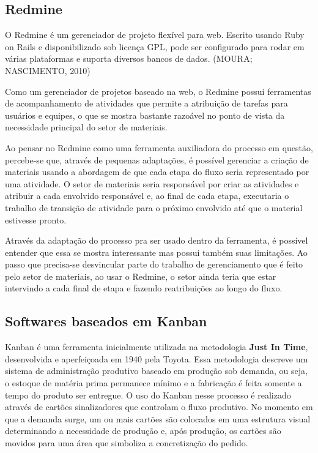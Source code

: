 \subsection{Redmine}

O Redmine é um gerenciador de projeto flexível para web. Escrito usando Ruby on Rails e disponibilizado sob licença GPL, pode ser configurado para rodar em várias plataformas e suporta diversos bancos de dados. (MOURA; NASCIMENTO, 2010)

Como um gerenciador de projetos baseado na web, o Redmine possui ferramentas de acompanhamento de atividades que permite a atribuição de tarefas para usuários e equipes, o que se mostra bastante razoável no ponto de vista da necessidade principal do setor de materiais. 

Ao pensar no Redmine como uma ferramenta auxiliadora do processo em questão, percebe-se que, através de pequenas adaptações, é possível gerenciar a criação de materiais usando a abordagem de que cada etapa do fluxo seria representado por uma atividade. O setor de materiais seria responsável por criar as atividades e atribuir a cada envolvido responsável e, ao final de cada etapa, executaria o trabalho de transição de atividade para o próximo envolvido até que o material estivesse pronto.

Através da adaptação do processo pra ser usado dentro da ferramenta, é possível entender que essa se mostra interessante mas possui também suas limitações. Ao passo que precisa-se desvincular parte do trabalho de gerenciamento que é feito pelo setor de materiais, ao usar o Redmine, o setor ainda teria que estar intervindo a cada final de etapa e fazendo reatribuições ao longo do fluxo.

\subsection{Softwares baseados em Kanban}

Kanban é uma ferramenta inicialmente utilizada na metodologia \textbf{Just In Time}, desenvolvida e aperfeiçoada em 1940 pela Toyota. Essa metodologia descreve um sistema de administração produtivo baseado em produção sob demanda, ou seja, o estoque de matéria prima permanece mínimo e a fabricação é feita somente a tempo do produto ser entregue. O uso do Kanban nesse processo é realizado através de cartões sinalizadores que controlam o fluxo produtivo. No momento em que a demanda surge, um ou mais cartões são colocados em uma estrutura visual determinando a necessidade de produção e, após produção, os cartões são movidos para uma área que simboliza a concretização do pedido.

